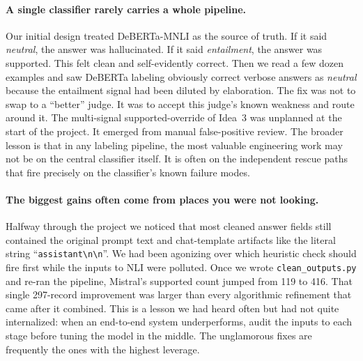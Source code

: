 \documentclass[11pt,a4paper]{article}
\newcommand{\lbl}[1]{\textit{#1}}
\begin{document}
\paragraph{A single classifier rarely carries a whole pipeline.} Our initial design treated DeBERTa-MNLI as the source of truth. If it said \lbl{neutral}, the answer was hallucinated. If it said \lbl{entailment}, the answer was supported. This felt clean and self-evidently correct. Then we read a few dozen examples and saw DeBERTa labeling obviously correct verbose answers as \lbl{neutral} because the entailment signal had been diluted by elaboration. The fix was not to swap to a ``better'' judge. It was to accept this judge's known weakness and route around it. The multi-signal supported-override of Idea~3 was unplanned at the start of the project. It emerged from manual false-positive review. The broader lesson is that in any labeling pipeline, the most valuable engineering work may not be on the central classifier itself. It is often on the independent rescue paths that fire precisely on the classifier's known failure modes.

\paragraph{The biggest gains often come from places you were not looking.} Halfway through the project we noticed that most cleaned answer fields still contained the original prompt text and chat-template artifacts like the literal string ``\texttt{assistant\textbackslash n\textbackslash n}''. We had been agonizing over which heuristic check should fire first while the inputs to NLI were polluted. Once we wrote \texttt{clean\_outputs.py} and re-ran the pipeline, Mistral's supported count jumped from 119 to 416. That single 297-record improvement was larger than every algorithmic refinement that came after it combined. This is a lesson we had heard often but had not quite internalized: when an end-to-end system underperforms, audit the inputs to each stage before tuning the model in the middle. The unglamorous fixes are frequently the ones with the highest leverage.
\end{document}
